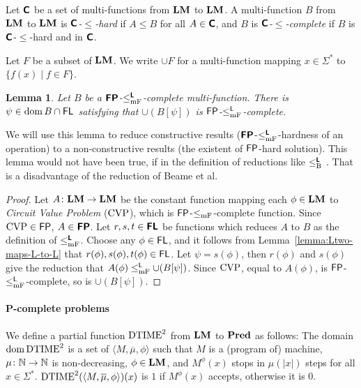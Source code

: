 \documentclass{article}
\newtheorem{lemma}[theorem]{Lemma}
\theoremstyle{definition}
\theoremstyle{remark}
\begin{document}
Let $\text{\bfseries \sffamily \upshape C}$ be a set of multi-functions from $\mathbf{LM}$ to $\mathbf{LM}$.
A multi-function $B$ from $\mathbf{LM}$ to $\mathbf{LM}$ is \emph{$\text{\bfseries \sffamily \upshape C}$-$\leq$-hard} if $A \leq B$ for all $A \in \text{\bfseries \sffamily \upshape C}$,
and $B$ is \emph{$\text{\bfseries \sffamily \upshape C}$-$\leq$-complete} 
if $B$ is $\text{\bfseries \sffamily \upshape C}$-$\leq$-hard and in $\text{\bfseries \sffamily \upshape C}$.

Let $F$ be a subset of $\mathbf{LM}$.
We write $\cup F$ for a multi-function mapping $x \in \Sigma^*$ to 
$\{f(x) \mid f \in F\}$.

\begin{lemma}
\label{lemma:P-complete}
Let $B$ be a $\text{\bfseries \sffamily \upshape FP}$-$\leq _{\mathrm{mF}} ^{\text{\bfseries \sffamily \upshape L}}$-complete multi-function.
There is $\psi \in \mathop{\rm dom} B \cap \mathsf{FL}$ satisfying that
 $\cup (B[\psi])$ is $\mathsf{FP}$-$\le^{\mathsf{L}}_{\mathrm{mF}}$-complete.
\end{lemma}

We will use this lemma to reduce constructive results
($\text{\bfseries \sffamily \upshape FP}$-$\leq _{\mathrm{mF}} ^{\text{\bfseries \sffamily \upshape L}}$-hardness of an operation) to a non-constructive 
results (the existent of $\mathsf{FP}$-hard solution).
This lemma would not have been true, if in the definition 
of reductions like $\leq _{\mathrm B} ^{\text{\bfseries \sffamily \upshape L}}$ \cite[Lemma~3.6]{kawamura2012complexity}.
That is a disadvantage of the reduction of Beame et al.

\begin{proof}
Let $A \colon \mathbf{LM} \to \mathbf{LM}$ be the constant function mapping each $\phi \in \mathbf{LM}$ to \emph{Circuit Value Problem} ($\mathrm{CVP}$), which is $\mathsf{FP}$-$\leq _{\mathrm{mF}}$-complete function.
Since $\mathrm{CVP} \in \mathsf{FP}$, $A \in \text{\bfseries \sffamily \upshape FP}$.
Let $r, s, t \in \text{\bfseries \sffamily \upshape FL}$ be functions which reduces $A$ to $B$
as the definition of $\leq _{\mathrm{mF}} ^{\text{\bfseries \sffamily \upshape L}}$.
Choose any $\phi \in \mathsf{FL}$, and it follows from Lemma~\ref{lemma:Ltwo-maps-L-to-L}
that $r(\phi), s(\phi), t(\phi) \in \mathsf{FL}$.
Let $\psi = s(\phi)$, then $r(\phi)$ and $s(\phi)$ give the reduction that
$A(\phi) \leq _{\mathrm{mF}}^{\mathsf{L}} \cup (B[\psi])$.
Since $\mathrm{CVP}$, equal to $A(\phi)$, is $\mathsf{FP}$-$\leq _{\mathrm{mF}}^{\mathsf{L}}$-complete,
so is $\cup (B[\psi])$.
\end{proof}


\paragraph{P-complete problems}

We define a partial function $\mathrm{DTIME}^2$ from $\mathbf{LM}$ to $\mathbf{Pred}$ as follows:
The domain $\mathop{\rm dom} \mathrm{DTIME}^2$ is a set of $\langle M, \overline \mu, \phi \rangle$
such that $M$ is a (program of) machine, $\mu \colon \mathbb N \to \mathbb N$ is non-decreasing, $\phi \in \mathbf{LM}$, and $M^\phi(x)$ stops in $\mu(|x|)$ steps for all $x \in \Sigma^*$.
$\mathrm{DTIME}^2(\langle M, \overline \mu, \phi \rangle)(x)$ is $1$ if
$M^\phi(x)$ accepts, otherwise it is 0.
\end{document}
